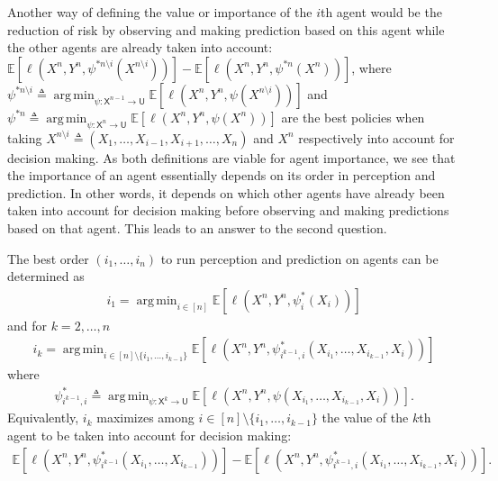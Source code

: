 \documentclass{article}
\newcommand{\E}{\mathbb{E}}
\DeclareMathOperator*{\argmin}{arg\,min}
\def\sU{{\mathsf U}}
\def\sX{{\mathsf X}}
\def\deq{\triangleq}
\begin{document}

Another way of defining the value or importance of the $i$th agent would be the reduction of risk by observing and making prediction based on this agent while the other agents are already taken into account:
$
\E[\ell(X^n, Y^n, \psi^{*n\setminus i}(X^{n\setminus i}))] - \E[\ell(X^n, Y^n, \psi^{*n}(X^n))]
$,
where 
$
\psi^{*n\setminus i} \deq \argmin_{\psi:\sX^{n-1} \rightarrow \sU}\E[\ell(X^n, Y^n, \psi(X^{n\setminus i}))] 
$
and 
$
\psi^{*n} \deq \argmin_{\psi:\sX^n\rightarrow\sU} \E[\ell(X^n, Y^n, \psi(X^n))] 
$
are the best policies when taking 
$X^{n\setminus i} \deq (X_1,\ldots, X_{i-1}, X_{i+1},\ldots,X_n)
$
and $X^n$ respectively into account for decision making.
As both definitions are viable for agent importance, we see that the importance of an agent essentially depends on its order in perception and prediction. In other words, it depends on which other agents have already been taken into account for decision making before observing and making predictions based on that agent.
This leads to an answer to the second question. 

The best order $(i_1,\ldots,i_n)$ to run perception and prediction on agents can be determined as
\begin{align}
i_1 = \argmin_{i\in[n]}  \E[\ell(X^n, Y^n, \psi_i^*(X_i))]
\end{align}
and for $k=2,\ldots,n$
\begin{align}
i_k = \argmin_{i\in[n]\setminus\{i_1,\ldots, i_{k-1}\}}  \E[\ell(X^n, Y^n, \psi^{*}_{i^{k-1},i}(X_{i_1},\ldots,X_{i_{k-1}}, X_i))]
\end{align}
where
\begin{align}
\psi^{*}_{i^{k-1},i} \deq \argmin_{\psi:\sX^k\rightarrow\sU} \E[\ell(X^n, Y^n, \psi(X_{i_1},\ldots,X_{i_{k-1}}, X_i))] .
\end{align}
Equivalently, $i_k$ maximizes among $i\in[n]\setminus\{i_1,\ldots, i_{k-1}\}$ the value of the $k$th agent to be taken into account for decision making:
\begin{align}
\E[\ell(X^n, Y^n, \psi^*_{i^{k-1}}(X_{i_1},\ldots,X_{i_{k-1}}))] 
- 
\E[\ell(X^n, Y^n, \psi^*_{i^{k-1},i}(X_{i_1},\ldots,X_{i_{k-1}}, X_i))] .
\end{align} 
\end{document}
